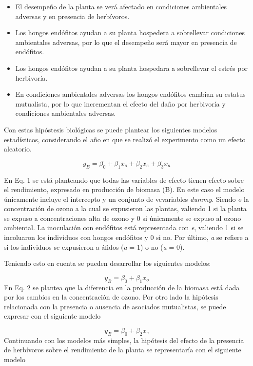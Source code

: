 \documentclass[
]{article}
\providecommand{\tightlist}{%
  \setlength{\itemsep}{0pt}\setlength{\parskip}{0pt}}
\begin{document}
\begin{itemize}
\tightlist
\item
  El desempeño de la planta se verá afectado en condiciones ambientales
  adversas y en presencia de herbívoros.
\item
  Los hongos endófitos ayudan a su planta hospedera a sobrellevar
  condiciones ambientales adversas, por lo que el desempeño será mayor
  en presencia de endófitos.
\item
  Los hongos endófitos ayudan a su planta hospedara a sobrellevar el
  estrés por herbivoría.
\item
  En condiciones ambientales adversas los hongos endófitos cambian su
  estatus mutualista, por lo que incrementan el efecto del daño por
  herbivoría y condiciones ambientales adversas.
\end{itemize}

Con estas hipóstesis biológicas se puede plantear los siguientes modelos
estadísticos, considerando el año en que se realizó el experimento como
un efecto aleatorio.

\[
\tag{Eq. 1}
y_B= \beta_{0} + \beta_{1}x_{o} + \beta_{2} x_{e} + \beta_{3}x_{a}    
\]

En Eq. 1 se está planteando que todas las variables de efecto tienen
efecto sobre el rendimiento, expresado en producción de biomasa (B). En
este caso el modelo únicamente incluye el intercepto y un conjunto de
vcvariables \emph{dummy}. Siendo \emph{o} la concentración de ozono a la
cual se expusieron las plantas, valiendo 1 si la planta se expuso a
concentraciones alta de ozono y 0 si únicamente se expuso al ozono
ambiental. La inoculación con endófitos está representada con \emph{e},
valiendo 1 si se incoluaron los individuos con hongos endófitos y 0 si
no. Por último, \emph{a} se refiere a si los individuos se expusieron a
áfidos (\emph{a} = 1) o no (\emph{a} = 0).

Teniendo esto en cuenta se pueden desarrollar los siguientes modelos:

\[
\tag{Eq. 2}
y_B= \beta_{0} + \beta_{1}x_{o}   
\] En Eq. 2 se plantea que la diferencia en la producción de la biomasa
está dada por los cambios en la concentración de ozono. Por otro lado la
hipótesis relacionada con la presencia o ausencia de asociados
mutualistas, se puede expresar con el siguiente modelo

\[
\tag{Eq. 3}
y_B= \beta_{0} + \beta_{2}x_{e} 
\] Continuando con los modelos más simples, la hipótesis del efecto de
la presencia de herbívoros sobre el rendimiento de la planta se
representaría con el siguiente modelo
\end{document}
